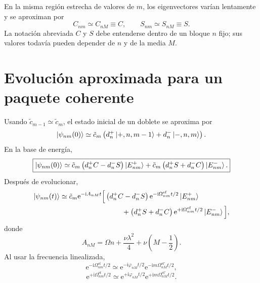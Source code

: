 \documentclass[11pt]{article}
\newcommand{\ii}{\mathrm{i}}
\newcommand{\ee}{\mathrm{e}}
\begin{document}
En la misma regi\'on estrecha de valores de $m$, los eigenvectores var\'ian
lentamente y se aproximan por
\begin{equation}
  \boxed{
  C_{nm}\simeq C_{nM}\equiv C,
  \qquad
  S_{nm}\simeq S_{nM}\equiv S.
  }
\end{equation}
La notaci\'on abreviada $C$ y $S$ debe entenderse dentro de un bloque $n$
fijo; sus valores todav\'ia pueden depender de $n$ y de la media $M$.

\section{Evoluci\'on aproximada para un paquete coherente}

Usando $\tilde c_{m-1}\simeq\tilde c_m$, el estado inicial de un doblete se
aproxima por
\begin{equation}
  \ket{\psi_{nm}(0)}
  \simeq
  \tilde c_m
  \left(
  d_n^+\ket{+,n,m-1}
  +
  d_n^-\ket{-,n,m}
  \right).
\end{equation}
En la base de energ\'ia,
\begin{equation}
  \boxed{
  \ket{\psi_{nm}(0)}
  \simeq
  \tilde c_m
  \left(d_n^+C-d_n^-S\right)\ket{E_{nm}^{+}}
  +
  \tilde c_m
  \left(d_n^+S+d_n^-C\right)\ket{E_{nm}^{-}}.
  }
\end{equation}
Despu\'es de evolucionar,
\begin{align}
  \ket{\psi_{nm}(t)}
  &\simeq
  \tilde c_m\ee^{-\ii A_{nM}t}
  \Big[
  \left(d_n^+C-d_n^-S\right)
  \ee^{-\ii\Omega_{nm}^{\mathrm{ef}}t/2}
  \ket{E_{nm}^{+}}
  \notag\\
  &\hspace{3.1cm}+
  \left(d_n^+S+d_n^-C\right)
  \ee^{+\ii\Omega_{nm}^{\mathrm{ef}}t/2}
  \ket{E_{nm}^{-}}
  \Big],
\end{align}
donde
\begin{equation}
  \boxed{
  A_{nM}
  =
  \Omega n+\frac{\nu\lambda^2}{4}
  +
  \nu\left(M-\frac12\right).
  }
\end{equation}
Al usar la frecuencia linealizada,
\begin{equation}
  \ee^{-\ii\Omega_{nm}^{\mathrm{ef}}t/2}
  \simeq
  \ee^{-\ii\varphi_{nM}t/2}
  \ee^{-\ii m\Omega_{nM}^{\mathrm{ef}\prime}t/2},
\end{equation}
\begin{equation}
  \ee^{+\ii\Omega_{nm}^{\mathrm{ef}}t/2}
  \simeq
  \ee^{+\ii\varphi_{nM}t/2}
  \ee^{+\ii m\Omega_{nM}^{\mathrm{ef}\prime}t/2}.
\end{equation}
\end{document}
